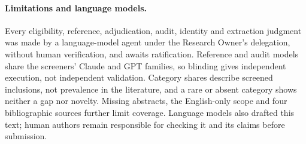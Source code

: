 \paragraph{Limitations and language models.}
Every eligibility, reference, adjudication, audit, identity and extraction judgment was made by a language-model agent under the Research Owner's delegation, without human verification, and awaits ratification. %
Reference and audit models share the screeners' Claude and GPT families, so blinding gives independent execution, not independent validation. %
Category shares describe screened inclusions, not prevalence in the literature, and a rare or absent category shows neither a gap nor novelty. %
Missing abstracts, the English-only scope and four bibliographic sources further limit coverage. %
Language models also drafted this text; human authors remain responsible for checking it and its claims before submission. %
